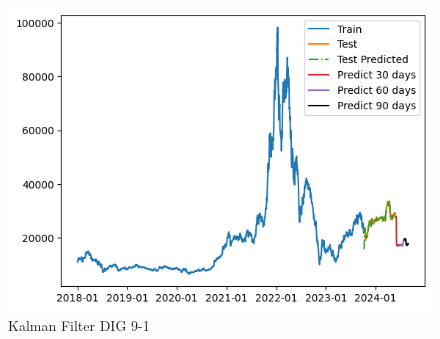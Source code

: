 \documentclass[conference]{IEEEtran}
\begin{document}
\begin{figure}[htbp]
    \begin{minipage}{0.23\textwidth}
    \centering
    \includegraphics[width=1\textwidth]{experiment/kf/DIG 9-1.png}
    \caption{Kalman Filter DIG 9-1}
    \label{fig:nvl_histogram}
    \end{minipage}

    \vspace{0.5cm} %


\end{figure}
\end{document}

